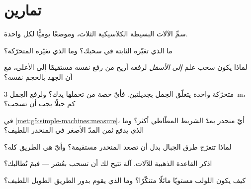 \section{تمارين}

\begin{exercise}[$\star$]\label{exo:g5:simple-machines:1}
سمِّ الآلات البسيطة الكلاسيكية الثلاث، وموضعًا يوميًّا لكل
واحدة.
\end{exercise}

\begin{exercise}[$\star$]\label{exo:g5:simple-machines:2}
ما الذي تغيّره  الثابتة في سحبك؟ وما الذي تغيّره 
المتحرّكة؟
\end{exercise}

\begin{exercise}[$\star$]\label{exo:g5:simple-machines:3}
لماذا يكون سحب علم \emph{إلى الأسفل} لرفعه أريح من رفع 
نفسه مستقيمًا إلى الأعلى، مع أن الجهد بالحجم نفسه؟
\end{exercise}

\begin{exercise}[$\star$]\label{exo:g5:simple-machines:4}
 متحرّكة واحدة يتعلّق الحِمل بجديلتين. فأيّ حصة من 
تحملها يدك؟ ولرفع الحِمل \qty{3}{m}، كم حبلًا يجب أن تسحب؟
\end{exercise}

\begin{exercise}[$\star$]\label{exo:g5:simple-machines:5}
في \cref{met:g5:simple-machines:measure}، أيّ منحدر يمدّ الشريط
المطّاطي أكثر؟ وما الذي يدفع ثمن المدّ الأصغر في المنحدر
اللطيف؟
\end{exercise}

\begin{exercise}[$\star$]\label{exo:g5:simple-machines:6}
لماذا تتعرّج طرق الجبال بدل أن تصعد المنحدر مستقيمة؟ وأيّ  هي الطريق كله؟
\end{exercise}

\begin{exercise}[$\star$]\label{exo:g5:simple-machines:7}
اذكر القاعدة الذهبية للآلات. آلة تتيح لك أن تسحب بعُشر 
--- فبمَ تُطالبك؟
\end{exercise}

\begin{exercise}[$\star$]\label{exo:g5:simple-machines:8}
كيف يكون اللولب مستويًا مائلًا متنكّرًا؟ وما الذي يقوم بدور
الطريق الطويل اللطيف؟
\end{exercise}

